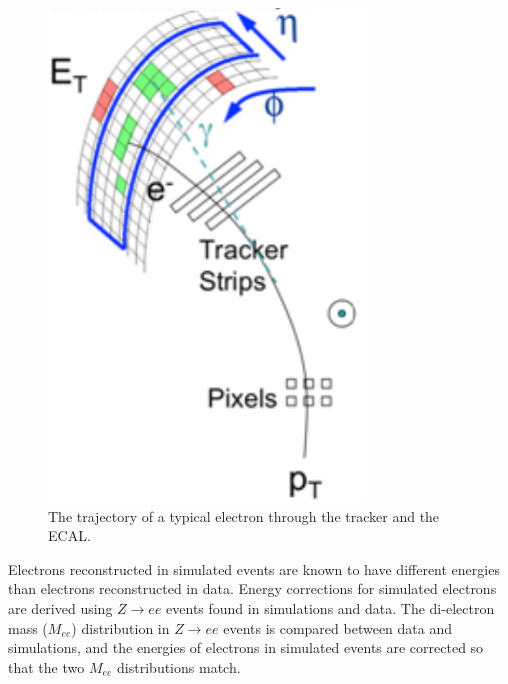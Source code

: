 \begin{figure}[h]
	\centering
	\includegraphics[width=0.75\textwidth]{figures/electronTrackAndSupercluster.png}
	\caption{The trajectory of a typical electron through the tracker and the ECAL.}
	\label{fig:eleTrackAndSC}
\end{figure}

Electrons reconstructed in simulated events are known to have different energies than electrons reconstructed in data.  Energy 
corrections for simulated electrons are derived using $Z \rightarrow ee$ events found in simulations and data.  The di-electron mass 
($M_{ee}$) distribution in $Z \rightarrow ee$ events is compared between data and simulations, and the energies of electrons 
in simulated events are corrected so that the two $M_{ee}$ distributions match.


